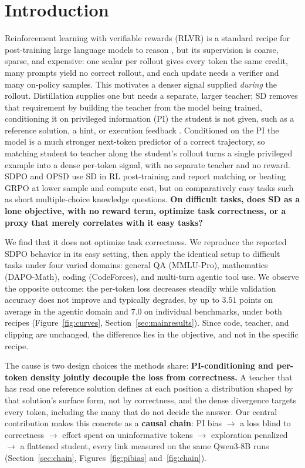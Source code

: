 \documentclass{article}
\begin{document}
\section{Introduction}
\label{sec:intro}
Reinforcement learning with verifiable rewards (RLVR) is a standard recipe for post-training large language models to reason \citep{grpo2024,rlvr2024}, but its supervision is coarse, sparse, and expensive: one scalar per rollout gives every token the same credit, many prompts yield no correct rollout, and each update needs a verifier and many on-policy samples. This motivates a denser signal supplied \textit{during} the rollout. Distillation \citep{distillm2024,OPD2024} supplies one but needs a separate, larger teacher; SD removes that requirement by building the teacher from the model being trained, conditioning it on privileged information (PI) the student is not given, such as a reference solution, a hint, or execution feedback \citep{sdft}. Conditioned on the PI the model is a much stronger next-token predictor of a correct trajectory, so matching student to teacher along the student's rollout turns a single privileged example into a dense per-token signal, with no separate teacher and no reward. SDPO \citep{sdpo2025} and OPSD \citep{opsd2025} use SD in RL post-training and report matching or beating GRPO at lower sample and compute cost, but on comparatively easy tasks such as short multiple-choice knowledge questions. \textbf{On difficult tasks, does SD as a lone objective, with no reward term, optimize task correctness, or a proxy that merely correlates with it easy tasks?}

We find that it does not optimize task correctness. We reproduce the reported SDPO behavior in its easy setting, then apply the identical setup to difficult tasks under four varied domains: general QA (MMLU-Pro), mathematics (DAPO-Math), coding (CodeForces), and multi-turn agentic tool use. We observe the opposite outcome: the per-token loss decreases steadily while validation accuracy does not improve and typically degrades, by up to $3.51$ points on average in the agentic domain and $7.0$ on individual benchmarks, under both recipes (Figure~\ref{fig:curves}, Section~\ref{sec:mainresults}). Since code, teacher, and clipping are unchanged, the difference lies in the objective, and not in the specific recipe.

The cause is two design choices the methods share: \textbf{PI-conditioning and per-token density jointly decouple the loss from correctness.} A teacher that has read one reference solution defines at each position a distribution shaped by that solution's surface form, not by correctness, and the dense divergence targets every token, including the many that do not decide the answer. Our central contribution makes this concrete as a \textbf{causal chain}: PI bias $\rightarrow$ a loss blind to correctness $\rightarrow$ effort spent on uninformative tokens $\rightarrow$ exploration penalized $\rightarrow$ a flattened student, every link measured on the same Qwen3-8B runs (Section~\ref{sec:chain}, Figures~\ref{fig:pibias} and~\ref{fig:chain}).
\end{document}
